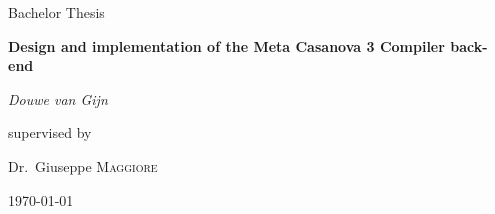 \documentclass[12pt,a4paper]{report}
\begin{document}
\begin{titlepage}
	\centering
	{\Large Bachelor Thesis\par}
        \vspace{2cm}
	       {\huge\bfseries Design and implementation of the Meta Casanova 3 Compiler back-end \par}
	\vfill
	{\Large\itshape Douwe van Gijn\par}
	\vfill
	supervised by\par
	Dr.~Giuseppe \textsc{Maggiore}
	\vfill
	{\large \today\par}
\end{titlepage}
\end{document}
